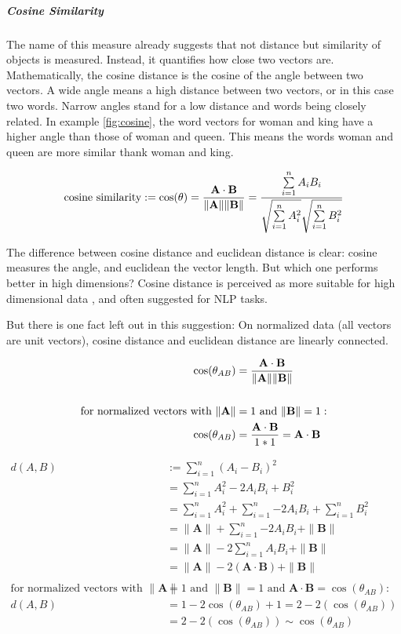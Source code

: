 		\subparagraph{Cosine Similarity}
		The name of this measure already suggests that not distance but similarity of objects is measured. Instead, it quantifies how close two vectors are.  Mathematically, the cosine distance is the cosine of the angle between two vectors. A wide angle means a high distance between two vectors, or in this case two words. Narrow angles stand for a low distance and words being closely related. In example \ref{fig:cosine}, the word vectors for woman and king have a higher angle than those of woman and queen. This means the words woman and queen are more similar thank woman and king.
		
		\[ 
		\text{cosine similarity} := \cos(\theta) = {\mathbf{A} \cdot \mathbf{B} \over \|\mathbf{A}\| \|\mathbf{B}\|} = \frac{ \sum\limits_{i=1}^{n}{A_i  B_i} }{ \sqrt{\sum\limits_{i=1}^{n}{A_i^2}}  \sqrt{\sum\limits_{i=1}^{n}{B_i^2}} }
		  \]
		
		The difference between cosine distance and euclidean distance is clear: cosine measures the angle, and euclidean the vector length. But which one performs better in high dimensions? Cosine distance is perceived as more suitable for high dimensional data \cite[c.2.1.2.1]{40algorithms}, and often suggested for \ac{NLP} tasks. 
		
		But there is one fact left out in this suggestion: On normalized data (all vectors are unit vectors), cosine distance and euclidean distance are linearly connected.
		
		\begin{align*}
			\cos(\theta_{AB}) &= {\mathbf{A} \cdot \mathbf{B} \over \|\mathbf{A}\| \|\mathbf{B}\|}  \\
			\\
			\text{for normalized vectors with } \|\mathbf{A}\| &=1 \text{ and } \|\mathbf{B}\| =1: \\
			\cos(\theta_{AB}) &=  {\mathbf{A} \cdot \mathbf{B} \over 1 * 1 } = \mathbf{A} \cdot \mathbf{B}
		\end{align*}
		
		\begin{align*}
			d(A, B) &:=  \sum\limits_{i=1}^{n}{(A_i -  B_i)^{2}} \\
			&= \sum\limits_{i=1}^{n}{A_i^{2} - 2A_iB_i + B_i^2}  \\ 
			&= \sum\limits_{i=1}^{n}{A_i^{2}} + \sum\limits_{i=1}^{n}{- 2A_iB_i} + \sum\limits_{i=1}^{n}{B_i^2} \\
			&= 	\|\mathbf{A}\| + \sum\limits_{i=1}^{n}{- 2A_iB_i} + \|\mathbf{B}\| \\
			&= \|\mathbf{A}\| -2 \sum\limits_{i=1}^{n}{A_iB_i} + \|\mathbf{B}\| \\
			&= \|\mathbf{A}\| -2 (\mathbf{A} \cdot \mathbf{B}) + \|\mathbf{B}\| \\
			\\
			\text{for normalized vectors with }\|\mathbf{A}\| &=1 \text{ and } \|\mathbf{B}\| =1  \text{ and } \mathbf{A} \cdot \mathbf{B}  = \cos(\theta_{AB}):\\
			d(A, B) &= 1 - 2 \cos(\theta_{AB}) + 1 = 2 - 2(\cos(\theta_{AB})) \\
			&= 2 - 2(\cos(\theta_{AB})) \sim \cos(\theta_{AB})
		\end{align*}
	
